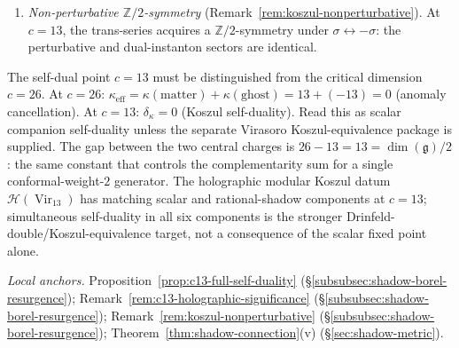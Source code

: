 \begin{remark}[The self-dual central charge $c = 13$]
\begin{enumerate}[label=\textup{(\roman*)}]
\item \emph{Non-perturbative $\mathbb{Z}/2$-symmetry}
 \textup{(}Remark~\textup{\ref{rem:koszul-nonperturbative}}\textup{)}.
 At $c = 13$, the trans-series acquires a
 $\mathbb{Z}/2$-symmetry under
 $\sigma \leftrightarrow -\sigma$: the perturbative and
 dual-instanton sectors are identical.
\end{enumerate}

\noindent
The self-dual point $c = 13$ must be distinguished from the
critical dimension $c = 26$.
At $c = 26$: $\kappa_{\mathrm{eff}} = \kappa(\mathrm{matter})
+ \kappa(\mathrm{ghost}) = 13 + (-13) = 0$ (anomaly
cancellation).
At $c = 13$: $\delta_\kappa = 0$ (Koszul self-duality).
Read this as scalar companion self-duality unless the separate
Virasoro Koszul-equivalence package is supplied.
The gap between the two central charges is
$26 - 13 = 13 = \dim(\mathfrak{g})/2$: the same constant that
controls the complementarity sum for a single conformal-weight-$2$
generator. The holographic modular Koszul datum
$\mathcal{H}(\operatorname{Vir}_{13})$ has matching scalar and
rational-shadow components at \(c=13\); simultaneous self-duality in
all six components is the stronger Drinfeld-double/Koszul-equivalence
target, not a consequence of the scalar fixed point alone.

\noindent\emph{Local anchors.}\enspace
Proposition~\ref{prop:c13-full-self-duality}
(\S\ref{subsubsec:shadow-borel-resurgence});
Remark~\ref{rem:c13-holographic-significance}
(\S\ref{subsubsec:shadow-borel-resurgence});
Remark~\ref{rem:koszul-nonperturbative}
(\S\ref{subsubsec:shadow-borel-resurgence});
Theorem~\ref{thm:shadow-connection}(v)
(\S\ref{sec:shadow-metric}).
\end{remark}



